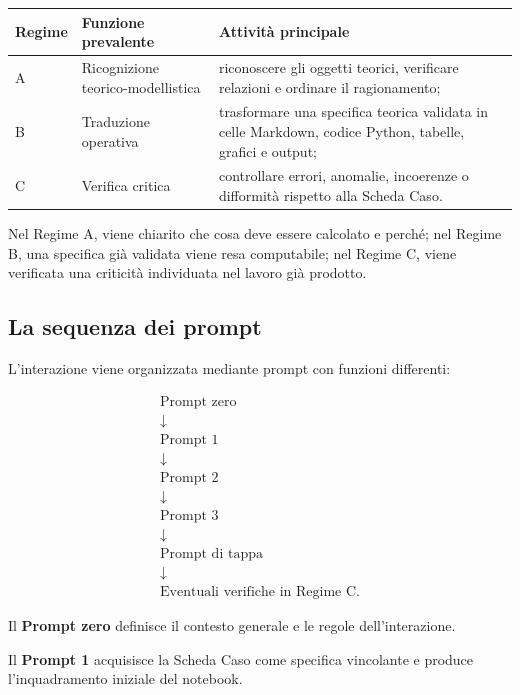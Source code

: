 \begin{center}
\small
\begin{tabular}{p{1.7cm}p{2.9cm}p{6.1cm}}
Regime & Funzione prevalente & Attivit\`{a} principale \\
\hline
A & Ricognizione teorico-modellistica &
riconoscere gli oggetti teorici, verificare relazioni e ordinare il
ragionamento; \\

B & Traduzione operativa &
trasformare una specifica teorica validata in celle Markdown, codice Python,
tabelle, grafici e output; \\

C & Verifica critica &
controllare errori, anomalie, incoerenze o difformit\`{a} rispetto alla
Scheda Caso.
\end{tabular}
\end{center}

Nel Regime A, viene chiarito che cosa deve essere calcolato e perch\'{e}; nel
Regime B, una specifica gi\`{a} validata viene resa computabile; nel Regime C,
viene verificata una criticit\`{a} individuata nel lavoro gi\`{a} prodotto.

\subsection{La sequenza dei prompt}

L'interazione viene organizzata mediante prompt con funzioni differenti:

\[
\begin{array}{c}
\text{Prompt zero}
\\
\downarrow
\\
\text{Prompt 1}
\\
\downarrow
\\
\text{Prompt 2}
\\
\downarrow
\\
\text{Prompt 3}
\\
\downarrow
\\
\text{Prompt di tappa}
\\
\downarrow
\\
\text{Eventuali verifiche in Regime C}.
\end{array}
\]

Il \textbf{Prompt zero} definisce il contesto generale e le regole
dell'interazione.

Il \textbf{Prompt 1} acquisisce la Scheda Caso come specifica vincolante e
produce l'inquadramento iniziale del notebook.

